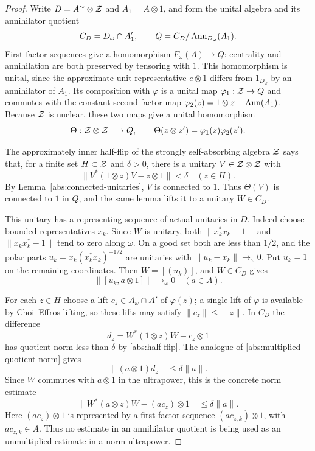 \begin{proof}
Write $D=A^{\sim}\otimes\mathcal Z$ and $A_1=A\otimes1$, and form the
unital algebra and its annihilator quotient
\[
 C_D=D_\omega\cap A_1',\qquad
 Q=C_D/\operatorname{Ann}_{D_\omega}(A_1).
\]
First-factor sequences give a homomorphism
$F_\omega(A)\to Q$: centrality and annihilation are both preserved
by tensoring with $1$.  This homomorphism is unital, since the
approximate-unit representative $e\otimes1$ differs from $1_{D_\omega}$
by an annihilator of $A_1$.  Its composition with $\varphi$ is a
unital map $\varphi_1:\mathcal Z\to Q$ and commutes with the constant
second-factor map $\varphi_2(z)=1\otimes z+\operatorname{Ann}(A_1)$.
Because $\mathcal Z$ is nuclear, these two maps give a unital homomorphism
\[
 \Theta:\mathcal Z\otimes\mathcal Z\longrightarrow Q,
 \qquad \Theta(z\otimes z')=\varphi_1(z)\varphi_2(z').
\]

The approximately inner half-flip of the strongly self-absorbing
algebra $\mathcal Z$ \cite[Proposition~1.5]{TW2007} says that, for a finite set $H\subset\mathcal Z$
and $\delta>0$, there is a unitary $V\in\mathcal Z\otimes\mathcal Z$ with
\begin{equation}\label{abs:half-flip}
 \|V^*(1\otimes z)V-z\otimes1\|<\delta\quad(z\in H).
\end{equation}
By Lemma~\ref{abs:connected-unitaries}, $V$ is connected to $1$.
Thus $\Theta(V)$ is connected to $1$ in $Q$, and the same lemma
lifts it to a unitary $W\in C_D$.

This unitary has a representing sequence of actual unitaries in $D$.
Indeed choose bounded representatives $x_k$.  Since $W$ is unitary,
both $\|x_k^*x_k-1\|$ and $\|x_kx_k^*-1\|$ tend to zero along
$\omega$.  On a good set both are less than $1/2$, and the polar
parts $u_k=x_k(x_k^*x_k)^{-1/2}$ are unitaries with
$\|u_k-x_k\|\to_\omega0$.  Put $u_k=1$ on the remaining
coordinates.  Then $W=[(u_k)]$, and $W\in C_D$ gives
\begin{equation}\label{abs:lift-centrality}
 \|[u_k,a\otimes1]\|\longrightarrow_\omega0\quad(a\in A).
\end{equation}

For each $z\in H$ choose a lift $c_z\in A_\omega\cap A'$ of
$\varphi(z)$; a single \cpc lift of $\varphi$ is available by
Choi--Effros lifting, so these lifts may satisfy
$\|c_z\|\le\|z\|$.  In $C_D$ the difference
\[
 d_z=W^*(1\otimes z)W-c_z\otimes1
\]
has quotient norm less than $\delta$ by \eqref{abs:half-flip}.
The analogue of \eqref{abs:multiplied-quotient-norm} gives
\[
 \|(a\otimes1)d_z\|\le\delta\|a\|.
\]
Since $W$ commutes with $a\otimes1$ in the ultrapower, this is
the concrete norm estimate
\begin{equation}\label{abs:half-flip-multiplied}
 \|W^*(a\otimes z)W-(ac_z)\otimes1\|\le\delta\|a\|.
\end{equation}
Here $(ac_z)\otimes1$ is represented by a first-factor sequence
$(ac_{z,k})\otimes1$, with $ac_{z,k}\in A$.
Thus no estimate in an annihilator quotient is being used as an
unmultiplied estimate in a norm ultrapower.


\end{proof}
